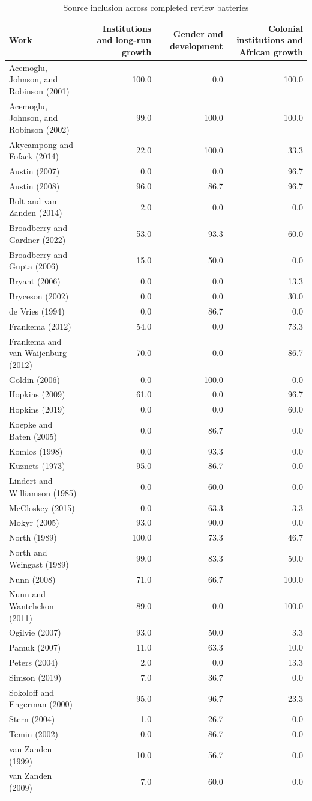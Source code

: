 \begin{table}[ht]
\centering
\caption{Source inclusion across completed review batteries}
\scriptsize
\begin{tabular}{lrrr}
\toprule
Work & Institutions and long-run growth & Gender and development & Colonial institutions and African growth \\
\midrule
Acemoglu, Johnson, and Robinson (2001) & 100.0 & 0.0 & 100.0 \\
Acemoglu, Johnson, and Robinson (2002) & 99.0 & 100.0 & 100.0 \\
Akyeampong and Fofack (2014) & 22.0 & 100.0 & 33.3 \\
Austin (2007) & 0.0 & 0.0 & 96.7 \\
Austin (2008) & 96.0 & 86.7 & 96.7 \\
Bolt and van Zanden (2014) & 2.0 & 0.0 & 0.0 \\
Broadberry and Gardner (2022) & 53.0 & 93.3 & 60.0 \\
Broadberry and Gupta (2006) & 15.0 & 50.0 & 0.0 \\
Bryant (2006) & 0.0 & 0.0 & 13.3 \\
Bryceson (2002) & 0.0 & 0.0 & 30.0 \\
de Vries (1994) & 0.0 & 86.7 & 0.0 \\
Frankema (2012) & 54.0 & 0.0 & 73.3 \\
Frankema and van Waijenburg (2012) & 70.0 & 0.0 & 86.7 \\
Goldin (2006) & 0.0 & 100.0 & 0.0 \\
Hopkins (2009) & 61.0 & 0.0 & 96.7 \\
Hopkins (2019) & 0.0 & 0.0 & 60.0 \\
Koepke and Baten (2005) & 0.0 & 86.7 & 0.0 \\
Komlos (1998) & 0.0 & 93.3 & 0.0 \\
Kuznets (1973) & 95.0 & 86.7 & 0.0 \\
Lindert and Williamson (1985) & 0.0 & 60.0 & 0.0 \\
McCloskey (2015) & 0.0 & 63.3 & 3.3 \\
Mokyr (2005) & 93.0 & 90.0 & 0.0 \\
North (1989) & 100.0 & 73.3 & 46.7 \\
North and Weingast (1989) & 99.0 & 83.3 & 50.0 \\
Nunn (2008) & 71.0 & 66.7 & 100.0 \\
Nunn and Wantchekon (2011) & 89.0 & 0.0 & 100.0 \\
Ogilvie (2007) & 93.0 & 50.0 & 3.3 \\
Pamuk (2007) & 11.0 & 63.3 & 10.0 \\
Peters (2004) & 2.0 & 0.0 & 13.3 \\
Simson (2019) & 7.0 & 36.7 & 0.0 \\
Sokoloff and Engerman (2000) & 95.0 & 96.7 & 23.3 \\
Stern (2004) & 1.0 & 26.7 & 0.0 \\
Temin (2002) & 0.0 & 86.7 & 0.0 \\
van Zanden (1999) & 10.0 & 56.7 & 0.0 \\
van Zanden (2009) & 7.0 & 60.0 & 0.0 \\
\bottomrule
\end{tabular}
\end{table}
